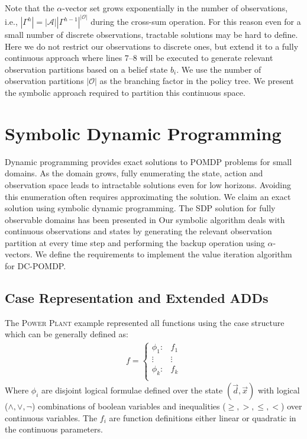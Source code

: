\documentclass{article} %
\begin{document}
Note that the $\alpha$-vector set grows exponentially in the number of observations, i.e., $|\Gamma^{h}| = |\mathcal{A}||\Gamma^{h-1}|^{|\mathcal{O}|}$ during the cross-sum operation. For this reason even for a small number of discrete observations, tractable solutions may be hard to define. Here we do not restrict our observations to discrete ones, but extend it to a fully continuous approach where lines 7--8 will be executed to generate relevant observation partitions based on a belief state $b_i$. We use the number of  observation partitions $|\mathcal{O}|$ as the branching factor in the policy tree. We present the symbolic approach required to partition this continuous space. 

\section{Symbolic Dynamic Programming} 
Dynamic programming provides exact solutions to POMDP problems for small domains. As the domain grows, fully enumerating the state, action and observation space leads to intractable solutions even for low horizons. Avoiding this enumeration often requires approximating the solution. We claim an exact solution using symbolic dynamic programming. The SDP solution for fully observable domains has been presented in \cite{sanner_uai11} %
Our symbolic algorithm deals with continuous observations and states by generating the relevant observation partition at every time step and performing the backup operation using $\alpha$-vectors. We define the requirements to implement the value iteration algorithm for DC-POMDP. 

\subsection{Case Representation and Extended ADDs}
The \textsc{Power Plant} example represented all functions using the case structure which can be generally defined as:
{\footnotesize 
\vspace{-3mm}
\begin{align}
f = 
\begin{cases}
  \phi_1: & f_1 \\ 
 \vdots&\vdots\\ 
  \phi_k: & f_k \\ 
\end{cases} \nonumber
\end{align}
}
Where $\phi_i$ are disjoint logical formulae defined over the state $(\vec{d},\vec{x})$ with logical ($\land,\lor,\neg$) combinations of boolean variables and inequalities ($\geq,>,\leq,<$) over continuous variables.  
The $f_i$ are function definitions either linear or quadratic in the continuous parameters. 
\end{document}
